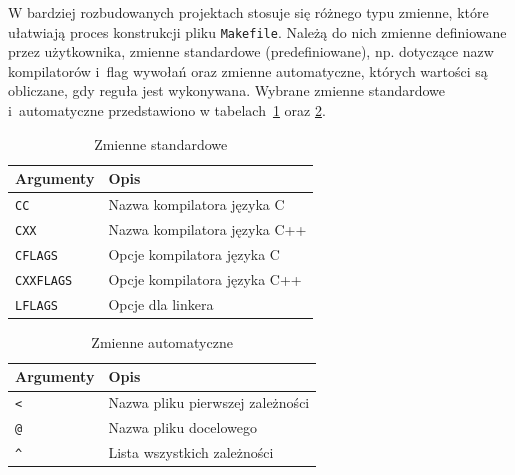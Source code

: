 \begin{example} \label{ex:rozbudowany}
W bardziej rozbudowanych projektach stosuje się różnego typu zmienne, które ułatwiają proces konstrukcji pliku \lstinline[style=MyBashStyle]{Makefile}. Należą do nich zmienne definiowane przez użytkownika, zmienne standardowe (predefiniowane), np. dotyczące nazw kompilatorów i~flag wywołań oraz zmienne automatyczne, których wartości są obliczane, gdy reguła jest wykonywana. Wybrane zmienne standardowe i~automatyczne przedstawiono w tabelach~\ref{tab:zmiennestandardowe} oraz \ref{tab:zmienneautomatyczne}.

\begin{table}[h!]
\centering
\caption{Zmienne standardowe}
\setlength{\arrayrulewidth}{1pt}
\setlength{\tabcolsep}{6pt}
\renewcommand{\arraystretch}{1.2}
\begin{tabular}{ |p{}|p{}|}
\hline \rowcolor{gray}
\textbf{Argumenty} & \textbf{Opis} \\ \hline
\mbox{\lstinline[style=MyBashStyle]{CC}} & Nazwa kompilatora języka C \\ \hline
\mbox{\lstinline[style=MyBashStyle]{CXX}} & Nazwa kompilatora języka C++ \\ \hline
\mbox{\lstinline[style=MyBashStyle]{CFLAGS}} & Opcje kompilatora języka C \\ \hline
\mbox{\lstinline[style=MyBashStyle]{CXXFLAGS}} & Opcje kompilatora języka C++  \\ \hline
\mbox{\lstinline[style=MyBashStyle]{LFLAGS}} & Opcje dla linkera  \\ \hline
\end{tabular}
\label{tab:zmiennestandardowe}
\end{table}


\begin{table}[h!]
\centering
\caption{Zmienne automatyczne}
\setlength{\arrayrulewidth}{1pt}
\setlength{\tabcolsep}{6pt}
\renewcommand{\arraystretch}{1.2}
\begin{tabular}{ |p{}|p{}|}
\hline \rowcolor{gray}
\textbf{Argumenty} & \textbf{Opis} \\ \hline
\mbox{\lstinline[style=MyBashStyle]{<}} & Nazwa pliku pierwszej zależności \\ \hline
\mbox{\lstinline[style=MyBashStyle]{@}} & Nazwa pliku docelowego \\ \hline
\mbox{\lstinline[style=MyBashStyle]{^}} & Lista wszystkich zależności \\ \hline
\end{tabular}
\label{tab:zmienneautomatyczne}
\end{table}


\end{example}
